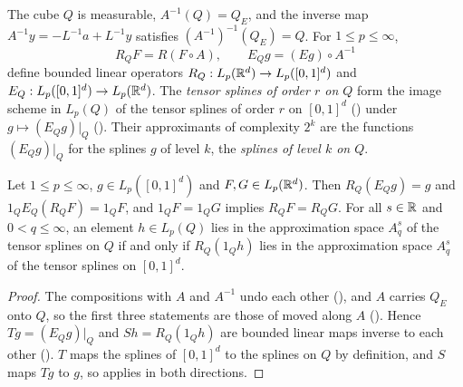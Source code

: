 \begin{definition}
\label{def:euclidean-cube-at}
\leanok
{}
The cube $Q$ is measurable, $A^{-1}(Q) = Q_E$, and the inverse map $A^{-1} y = -L^{-1} a +
L^{-1} y$ satisfies $(A^{-1})^{-1}(Q_E) = Q$. For $1 \leq p \leq \infty$,
\[
  R_Q F = R(F \circ A) , \qquad E_Q g = (E g) \circ A^{-1}
\]
define bounded linear operators $R_Q : L_p(\mathbb{R}^d) \to L_p([0, 1]^d)$ and
$E_Q : L_p([0, 1]^d) \to L_p(\mathbb{R}^d)$. The \emph{tensor splines of order $r$ on $Q$} form the image
scheme in $L_p(Q)$ of the tensor splines of order $r$ on $[0, 1]^d$ ()
under $g \mapsto (E_Q g)|_Q$ (). Their approximants of complexity $2^k$ are the
functions $(E_Q g)|_Q$ for the splines $g$ of level $k$, the \emph{splines of level $k$ on $Q$}.
\end{definition}

\begin{proposition}
\label{prop:cube-spline-scheme-at}
\leanok
{}
Let $1 \leq p \leq \infty$, $g \in L_p([0, 1]^d)$ and $F, G \in L_p(\mathbb{R}^d)$. Then
$R_Q(E_Q g) = g$ and $1_Q E_Q(R_Q F) = 1_Q F$, and $1_Q F = 1_Q G$ implies $R_Q F = R_Q G$. For
all $s \in \mathbb{R}$ and $0 < q \leq \infty$, an element $h \in L_p(Q)$ lies in the approximation space
$A^s_q$ of the tensor splines on $Q$ if and only if $R_Q(1_Q h)$ lies in the approximation space
$A^s_q$ of the tensor splines on $[0, 1]^d$.
\end{proposition}

\begin{proof}
\leanok
{}
The compositions with $A$ and $A^{-1}$ undo each other (), and $A$
carries $Q_E$ onto $Q$, so the first three statements are those of
 moved along $A$ (). Hence
$T g = (E_Q g)|_Q$ and $S h = R_Q(1_Q h)$ are bounded linear maps inverse to each other
(). $T$ maps the splines of $[0, 1]^d$ to the splines on $Q$ by
definition, and $S$ maps $T g$ to $g$, so  applies in both
directions.
\end{proof}

